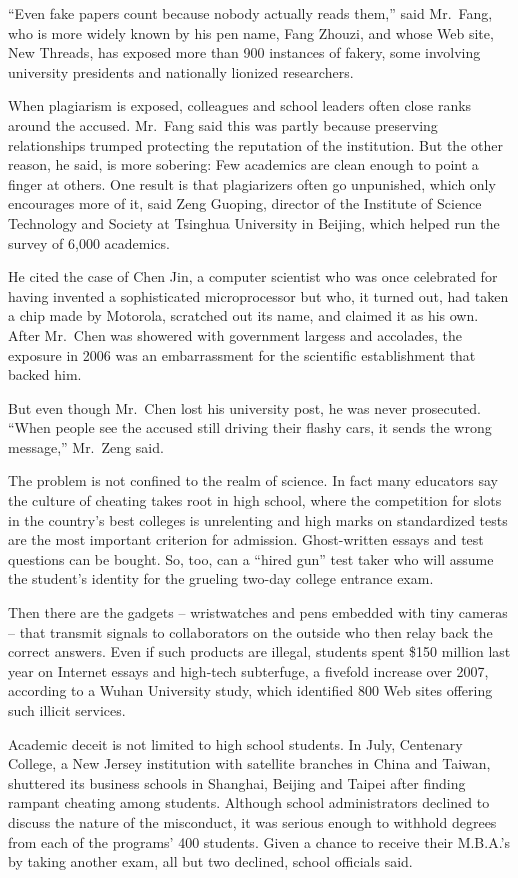 ﻿\documentclass[12pt]{article}
\begin{document}
``Even fake papers count because nobody actually reads them,'' said Mr.~Fang, who is more widely
known by his pen name, Fang Zhouzi, and whose Web site, New Threads, has exposed more than 900
instances of fakery, some involving university presidents and nationally lionized researchers.

When plagiarism is exposed, colleagues and school leaders often close ranks around the accused.
Mr.~Fang said this was partly because preserving relationships trumped protecting the reputation of
the institution. But the other reason, he said, is more sobering: Few academics are clean enough to
point a finger at others. One result is that plagiarizers often go unpunished, which only encourages
more of it, said Zeng Guoping, director of the Institute of Science Technology and Society at
Tsinghua University in Beijing, which helped run the survey of 6,000 academics.

He cited the case of Chen Jin, a computer scientist who was once celebrated for having invented a
sophisticated microprocessor but who, it turned out, had taken a chip made by Motorola, scratched
out its name, and claimed it as his own. After Mr.~Chen was showered with government largess and
accolades, the exposure in 2006 was an embarrassment for the scientific establishment that backed
him.

But even though Mr.~Chen lost his university post, he was never prosecuted. ``When people see the
accused still driving their flashy cars, it sends the wrong message,'' Mr.~Zeng said.

The problem is not confined to the realm of science. In fact many educators say the culture of
cheating takes root in high school, where the competition for slots in the country's best colleges
is unrelenting and high marks on standardized tests are the most important criterion for admission.
Ghost-written essays and test questions can be bought. So, too, can a ``hired gun'' test taker who
will assume the student's identity for the grueling two-day college entrance exam.

Then there are the gadgets -- wristwatches and pens embedded with tiny cameras -- that transmit
signals to collaborators on the outside who then relay back the correct answers. Even if such
products are illegal, students spent \$150 million last year on Internet essays and high-tech
subterfuge, a fivefold increase over 2007, according to a Wuhan University study, which identified
800 Web sites offering such illicit services.

Academic deceit is not limited to high school students. In July, Centenary College, a New Jersey
institution with satellite branches in China and Taiwan, shuttered its business schools in Shanghai,
Beijing and Taipei after finding rampant cheating among students. Although school administrators
declined to discuss the nature of the misconduct, it was serious enough to withhold degrees from
each of the programs' 400 students. Given a chance to receive their M.B.A.'s by taking another exam,
all but two declined, school officials said.
\end{document}
